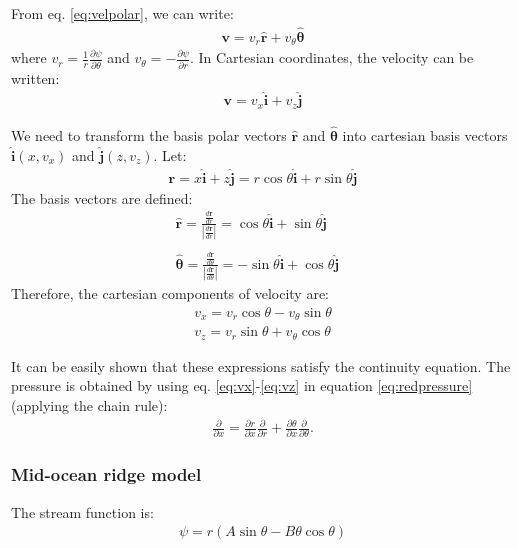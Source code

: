 \documentclass[a4paper,11pt]{article}
\begin{document}
From eq. \ref{eq:velpolar}, we can write:
\begin{align}
\textbf{v} = v_r\hat{\textbf{r}}+v_\theta\hat{\bm{\theta}}
\end{align}
where $v_r= \frac{1}{r}\frac{\partial\psi}{\partial\theta}$ and $v_\theta=-\frac{\partial\psi}{\partial r}$. In Cartesian coordinates, the velocity can be written:
\begin{align}
\textbf{v} = v_x\hat{\textbf{i}}+v_z\hat{\textbf{j}}
\end{align}

We need to transform the basis polar vectors $\hat{\textbf{r}}$ and $\hat{\bm{\theta}}$ into cartesian basis vectors $\hat{\textbf{i}}(x,v_x)$ and $\hat{\textbf{j}}(z,v_z)$. Let:
\begin{align}
\textbf{r} = x\hat{\textbf{i}}+z\hat{\textbf{j}} = r\cos\theta\hat{\textbf{i}} + r\sin\theta\hat{\textbf{j}}
\end{align}
The basis vectors are defined: 
\begin{align}
\hat{\textbf{r}} = \frac{\frac{d\textbf{r}}{dr}}{\left|\frac{d\textbf{r}}{dr}\right|} = \cos\theta\hat{\textbf{i}} + \sin\theta\hat{\textbf{j}}\\
&\nonumber  \\
\hat{\bm{\theta}} = \frac{\frac{d\textbf{r}}{d\theta}}{\left|\frac{d\textbf{r}}{d\theta}\right|} = -\sin\theta\hat{\textbf{i}} + \cos\theta\hat{\textbf{j}}
\end{align}
Therefore, the cartesian components of velocity are:
\begin{align}
v_x = v_r\cos\theta - v_\theta\sin\theta \label{eq:vx}\\
v_z = v_r\sin\theta + v_\theta\cos\theta \label{eq:vz}
\end{align}

It can be easily shown that these expressions satisfy the continuity equation. The pressure is obtained by using eq. \ref{eq:vx}-\ref{eq:vz} in equation \ref{eq:redpressure} (applying the chain rule):
\begin{align}
 \frac{\partial}{\partial x}=\frac{\partial r}{\partial x}\frac{\partial}{\partial r}+\frac{\partial \theta}{\partial x}\frac{\partial}{\partial \theta}.
 \end{align}

\subsubsection{Mid-ocean ridge model \citep{Spiegelman1987}}
The stream function is:
\begin{align}
\psi = r(A\sin\theta-B\theta\cos\theta)
\end{align}
\end{document}
